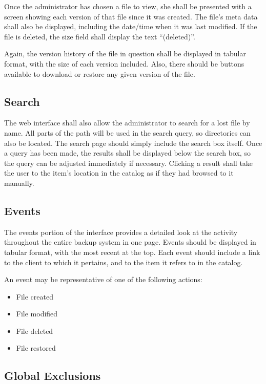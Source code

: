 Once the administrator has chosen a file to view, she shall be presented with
a screen showing each version of that file since it was created. The file's
meta data shall also be displayed, including the date/time when it was last
modified. If the file is deleted, the size field shall display the text
``(deleted)''.

Again, the version history of the file in question shall be displayed in
tabular format, with the size of each version included. Also, there should be
buttons available to download or restore any given version of the file.

\subsection{Search}

The web interface shall also allow the administrator to search for a lost file
by name. All parts of the path will be used in the search query, so directories
can also be located. The search page should simply include the search box
itself. Once a query has been made, the results shall be displayed below the
search box, so the query can be adjusted immediately if necessary. Clicking
a result shall take the user to the item's location in the catalog as if they
had browsed to it manually.

\subsection{Events}

The events portion of the interface provides a detailed look at the activity
throughout the entire backup system in one page. Events should be displayed in
tabular format, with the most recent at the top. Each event should include
a link to the client to which it pertains, and to the item it refers to in the
catalog.

An event may be representative of one of the following actions:

\begin{itemize}
    \item File created
    \item File modified
    \item File deleted
    \item File restored
\end{itemize}

\subsection{Global Exclusions}

